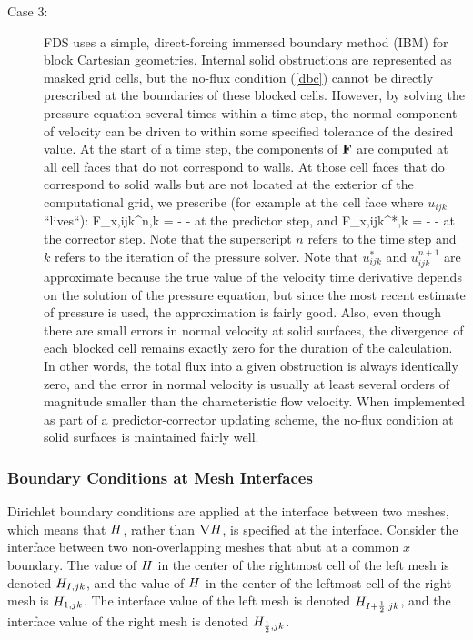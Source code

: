 \begin{description}
\item[Case 3:] FDS uses a simple, direct-forcing immersed boundary method (IBM) \cite{Fadlun:2000} for block Cartesian geometries. Internal solid obstructions are represented as masked grid cells, but the no-flux condition (\ref{dbc}) cannot be directly prescribed at the boundaries of these blocked cells. However, by solving the pressure equation several times within a time step, the normal component of velocity can be driven to within some specified tolerance of the desired value. At the start of a time step, the components of ${\mathbf{F}}$ are computed at all cell faces that do not correspond to walls. At those cell faces that do correspond to solid walls but are not located at the exterior of the computational grid, we prescribe (for example at the cell face where $u_{ijk}$ ``lives``): \be F_{x,ijk}^{n,k} = -  - \label{sbc} \ee at the predictor step, and \be F_{x,ijk}^{*,k} = -  -  \label{sbcc} \ee at the corrector step. Note that the superscript $n$ refers to the time step and $k$ refers to the iteration of the pressure solver. Note that $u_{ijk}^*$ and $u_{ijk}^{n+1}$ are approximate because the true value of the velocity time derivative depends on the solution of the pressure equation, but since the most recent estimate of pressure is used, the approximation is fairly good. Also, even though there are small errors in normal velocity at solid surfaces, the divergence of each blocked cell remains exactly zero for the duration of the calculation. In other words, the total flux into a given obstruction is always identically zero, and the error in normal velocity is usually at least several orders of magnitude smaller than the characteristic flow velocity. When implemented as part of a predictor-corrector updating scheme, the no-flux condition at solid surfaces is maintained fairly well.
\end{description}


\subsubsection{Boundary Conditions at Mesh Interfaces}
\label{section:mesh_interface}

Dirichlet boundary conditions are applied at the interface between two meshes, which means that $H$, rather than $\nabla H$, is specified at the interface. Consider the interface between two non-overlapping meshes that abut at a common $x$ boundary. The value of $H$ in the center of the rightmost cell of the left mesh is denoted $H_{I,jk}$, and the value of $H$ in the center of the leftmost cell of the right mesh is $H_{1,jk}$. The interface value of the left mesh is denoted $H_{I+\frac{1}{2},jk}$, and the interface value of the right mesh is denoted $H_{\frac{1}{2},jk}$.

